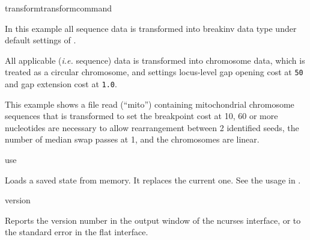 \begin{command}{transform}{transformcommand}
\begin{poyexamples}
            
           
          {In this example all sequence data is transformed into breakinv data
          type under default settings of .}
          
          {All applicable (\emph{i.e.} sequence) data is transformed into chromosome
          data, which is treated as a circular chromosome, and settings locus-level gap
          opening cost at \texttt{50} and gap extension cost at \texttt{1.0}.}
              
              {This example shows a file read (``mito'') containing
              mitochondrial chromosome sequences that is transformed to set the
              breakpoint cost at 10, 60 or more nucleotides are necessary to allow 
              rearrangement between 2 identified seeds, the number of median swap passes at 1,
               and the chromosomes are linear. }
            
	\end{poyexamples}	    

\end{command}


\begin{command}{use}{}

	\syntax{\obligatory{(\poystring)}}

	\begin{poydescription}
         Loads a saved \poy state from memory. It replaces the current one. See
         the usage in .
	\end{poydescription}

    \begin{poyalso}
    \end{poyalso}

\end{command}

\begin{command}{version}{}

	\syntax{\obligatory{()}}

	\begin{poydescription}
            Reports the \poy version number in the output window of the ncurses
            interface, or to the standard error in the flat interface.
	\end{poydescription}

    \begin{poyexamples}
    \end{poyexamples}
\end{command}

